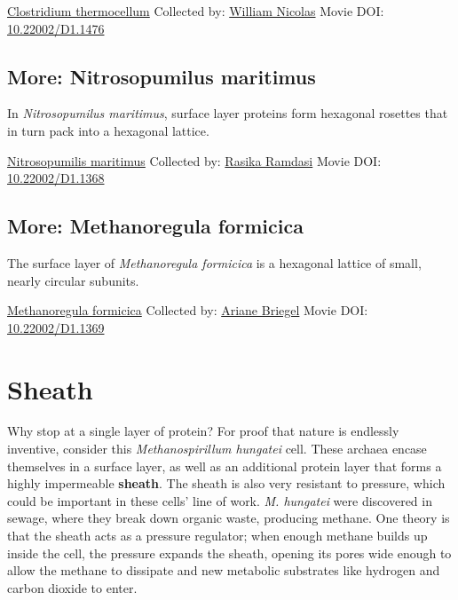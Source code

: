 \documentclass[]{tufte-book}
\begin{document}
\hypertarget{htmlwidget-e48388798f10f9ee0fd6}{}

\label{fig:2-7b}\protect\hyperlink{tree}{Clostridium thermocellum} Collected by: \protect\hyperlink{william_nicolas}{William Nicolas} Movie DOI: \href{https://doi.org/10.22002/D1.1476}{10.22002/D1.1476}

\hypertarget{Nitrosopumilus_maritimus}{%
\subsection*{More: Nitrosopumilus maritimus}\label{Nitrosopumilus_maritimus}}

In \emph{Nitrosopumilus maritimus}, surface layer proteins form hexagonal rosettes that in turn pack into a hexagonal lattice.



\hypertarget{htmlwidget-e0ab6e10c15124258e0c}{}

\label{fig:2-7c}\protect\hyperlink{tree}{Nitrosopumilis maritimus} Collected by: \protect\hyperlink{rasika_ramdasi}{Rasika Ramdasi} Movie DOI: \href{https://doi.org/10.22002/D1.1368}{10.22002/D1.1368}

\hypertarget{Methanoregula_formicica}{%
\subsection*{More: Methanoregula formicica}\label{Methanoregula_formicica}}

The surface layer of \emph{Methanoregula formicica} is a hexagonal lattice of small, nearly circular subunits.



\hypertarget{htmlwidget-8b5f95922400e295a33d}{}

\label{fig:2-7d}\protect\hyperlink{tree}{Methanoregula formicica} Collected by: \protect\hyperlink{ariane_briegel}{Ariane Briegel} Movie DOI: \href{https://doi.org/10.22002/D1.1369}{10.22002/D1.1369}

\hypertarget{sheath}{%
\section{Sheath}\label{sheath}}

Why stop at a single layer of protein? For proof that nature is endlessly inventive, consider this \emph{Methanospirillum hungatei} cell. These archaea encase themselves in a surface layer, as well as an additional protein layer that forms a highly impermeable \textbf{sheath}. The sheath is also very resistant to pressure, which could be important in these cells' line of work. \emph{M. hungatei} were discovered in sewage, where they break down organic waste, producing methane. One theory is that the sheath acts as a pressure regulator; when enough methane builds up inside the cell, the pressure expands the sheath, opening its pores wide enough to allow the methane to dissipate and new metabolic substrates like hydrogen and carbon dioxide to enter.
\end{document}

